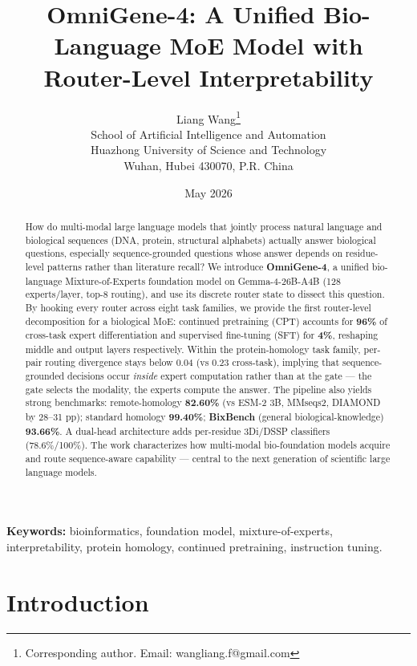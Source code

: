 \documentclass[11pt]{article}
\title{\textbf{OmniGene-4: A Unified Bio-Language MoE Model with\\ Router-Level Interpretability}}
\author{Liang Wang\thanks{Corresponding author. Email: wangliang.f@gmail.com}\\
\small School of Artificial Intelligence and Automation\\
\small Huazhong University of Science and Technology\\
\small Wuhan, Hubei 430070, P.R. China}
\date{May 2026}
\begin{document}
\maketitle

\begin{abstract}
\noindent How do multi-modal large language models that jointly process natural language and biological sequences (DNA, protein, structural alphabets) actually answer biological questions, especially sequence-grounded questions whose answer depends on residue-level patterns rather than literature recall? We introduce \textbf{OmniGene-4}, a unified bio-language Mixture-of-Experts foundation model on Gemma-4-26B-A4B (128 experts/layer, top-8 routing), and use its discrete router state to dissect this question. By hooking every router across eight task families, we provide the first router-level decomposition for a biological MoE: continued pretraining (CPT) accounts for \textbf{96\%} of cross-task expert differentiation and supervised fine-tuning (SFT) for \textbf{4\%}, reshaping middle and output layers respectively. Within the protein-homology task family, per-pair routing divergence stays below 0.04 (vs 0.23 cross-task), implying that sequence-grounded decisions occur \emph{inside} expert computation rather than at the gate --- the gate selects the modality, the experts compute the answer. The pipeline also yields strong benchmarks: remote-homology \textbf{82.60\%} (vs ESM-2 3B, MMseqs2, DIAMOND by 28--31 pp); standard homology \textbf{99.40\%}; \textbf{BixBench} (general biological-knowledge) \textbf{93.66\%}. A dual-head architecture adds per-residue 3Di/DSSP classifiers (78.6\%/100\%). The work characterizes how multi-modal bio-foundation models acquire and route sequence-aware capability --- central to the next generation of scientific large language models.
\end{abstract}


\medskip
\noindent\textbf{Keywords:} bioinformatics, foundation model, mixture-of-experts, interpretability, protein homology, continued pretraining, instruction tuning.



\section{Introduction}
\end{document}

